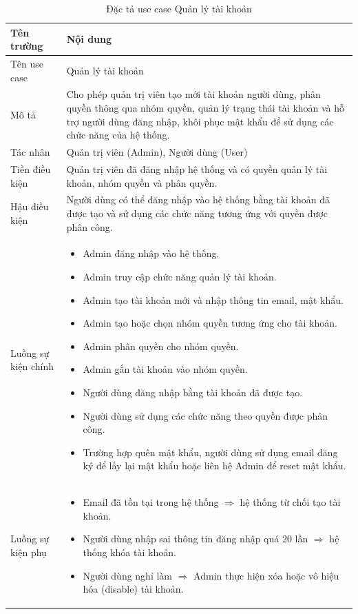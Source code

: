 \documentclass[../DoAn.tex]{subfiles}
\begin{document}
\begin{table}[H]
\centering
\caption{Đặc tả use case Quản lý tài khoản}
\label{tab:usecase_quanlytaikhoan}
\renewcommand{\arraystretch}{1.4}
\begin{tabular}{|p{4cm}|p{10cm}|}
\hline
\textbf{Tên trường} & \textbf{Nội dung} \\ \hline

Tên use case &
Quản lý tài khoản \\ \hline

Mô tả &
Cho phép quản trị viên tạo mới tài khoản người dùng, phân quyền thông qua nhóm quyền, quản lý trạng thái tài khoản và hỗ trợ người dùng đăng nhập, khôi phục mật khẩu để sử dụng các chức năng của hệ thống. \\ \hline

Tác nhân &
Quản trị viên (Admin), Người dùng (User) \\ \hline

Tiền điều kiện &
Quản trị viên đã đăng nhập hệ thống và có quyền quản lý tài khoản, nhóm quyền và phân quyền. \\ \hline

Hậu điều kiện &
Người dùng có thể đăng nhập vào hệ thống bằng tài khoản đã được tạo và sử dụng các chức năng tương ứng với quyền được phân công. \\ \hline

Luồng sự kiện chính &
\begin{itemize}
    \item Admin đăng nhập vào hệ thống.
    \item Admin truy cập chức năng quản lý tài khoản.
    \item Admin tạo tài khoản mới và nhập thông tin email, mật khẩu.
    \item Admin tạo hoặc chọn nhóm quyền tương ứng cho tài khoản.
    \item Admin phân quyền cho nhóm quyền.
    \item Admin gắn tài khoản vào nhóm quyền.
    \item Người dùng đăng nhập bằng tài khoản đã được tạo.
    \item Người dùng sử dụng các chức năng theo quyền được phân công.
    \item Trường hợp quên mật khẩu, người dùng sử dụng email đăng ký để lấy lại mật khẩu hoặc liên hệ Admin để reset mật khẩu.
\end{itemize}
\\ \hline

Luồng sự kiện phụ &
\begin{itemize}
    \item Email đã tồn tại trong hệ thống $\Rightarrow$ hệ thống từ chối tạo tài khoản.
    \item Người dùng nhập sai thông tin đăng nhập quá 20 lần $\Rightarrow$ hệ thống khóa tài khoản.
    \item Người dùng nghỉ làm $\Rightarrow$ Admin thực hiện xóa hoặc vô hiệu hóa (disable) tài khoản.
\end{itemize}
\\ \hline

\end{tabular}
\end{table}
\end{document}
